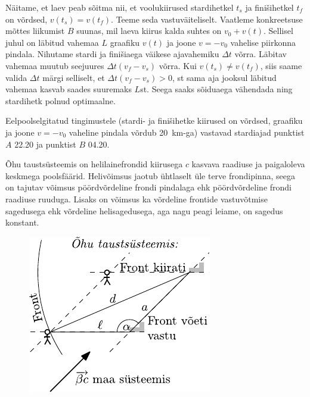 \documentclass[10pt, twoside]{article}
\begin{document}
{
\solu
Näitame, et laev peab sõitma nii, et voolukiirused stardihetkel $t_s$ ja finišihetkel $t_f$ on võrdsed, $v(t_s) = v(t_f)$. Teeme seda vastuväiteliselt. Vaatleme konkreetsuse mõttes liikumist $B$ suunas, mil laeva kiirus kalda suhtes on $v_0 + v(t)$. Sellisel juhul on läbitud vahemaa $L$ graafiku $v(t)$ ja joone $v = -v_0$ vahelise piirkonna pindala. Nihutame stardi ja finišiaega väikese ajavahemiku $\Delta t$ võrra. Läbitav vahemaa muutub seejuures $\Delta t(v_f - v_s)$ võrra. Kui $v(t_s) \neq v(t_f)$, siis saame valida $\Delta t$ märgi selliselt, et $\Delta t(v_f - v_s) > 0$, st sama aja jooksul läbitud vahemaa kasvab saades suuremaks $L$st. Seega saaks sõiduaega vähendada ning stardihetk polnud optimaalne.

Eelpoolselgitatud tingimustele (stardi- ja finišihetke kiirused on võrdsed, graafiku ja joone $v = -v_0$ vaheline pindala võrdub \SI{20}{km}-ga) vastavad stardiajad punktist $A$ 22.20 ja punktist $B$ 04.20.
\probend
\bigskip


\solu
Õhu taustsüsteemis on helilainefrondid kiirusega $c$ kasvava raadiuse ja paigaloleva keskmega poolsfäärid. Helivõimsus jaotub ühtlaselt üle terve frondipinna, seega on tajutav võimsus pöördvõrdeline frondi pindalaga ehk pöördvõrdeline frondi raadiuse ruuduga. Lisaks on võimsus ka võrdeline frontide vastuvõtmise sagedusega ehk võrdeline helisagedusega, aga nagu peagi leiame, on sagedus konstant.

\begin{figure}
	\vspace{-10pt}
	\begin{center}
		\includegraphics[width = 0.9\linewidth]{2009-lahg-10-lah}
	\end{center}
\end{figure}

}
\end{document}

